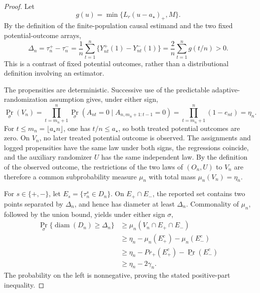 \documentclass{article}
\begin{document}
\begin{proof}
Let
\[
 g(u)=\min\{L_r(u-a_\star)_+,M\}.
\]
By the definition of the finite-population causal estimand and the two fixed potential-outcome arrays,
\[
 \Delta_n
 =\tau_n^+-\tau_n^-
 =\frac1n\sum_{t=1}^n\{Y_{nt}^+(1)-Y_{nt}^-(1)\}
 =\frac2n\sum_{t=1}^n g(t/n)>0.
\]
This is a contrast of fixed potential outcomes, rather than a distributional definition involving an estimator.

The propensities are deterministic.  Successive use of the predictable adaptive-randomization assumption gives, under either sign,
\[
 \Pr_\sigma(V_n)
 =\prod_{t=m_n+1}^n
   \Pr_\sigma(A_{nt}=0\mid A_{n,m_n+1:t-1}=0)
 =\prod_{t=m_n+1}^n(1-e_{nt})=\eta_n.
\]
For \(t\le m_n=\lfloor a_\star n\rfloor\), one has \(t/n\le a_\star\), so both treated potential outcomes are zero.  On \(V_n\), no later treated potential outcome is observed.  The assignments and logged propensities have the same law under both signs, the regressions coincide, and the auxiliary randomizer \(U\) has the same independent law.  By the definition of the observed outcome, the restrictions of the two laws of \((O_n,U)\) to \(V_n\) are therefore a common subprobability measure \(\mu_n\) with total mass \(\mu_n(V_n)=\eta_n\).

For \(s\in\{+,-\}\), let \(E_s=\{\tau_n^s\in D_n\}\).  On \(E_+\cap E_-\), the reported set contains two points separated by \(\Delta_n\), and hence has diameter at least \(\Delta_n\).  Commonality of \(\mu_n\), followed by the union bound, yields under either sign \(\sigma\),
\[
\begin{aligned}
 \Pr_\sigma\{\operatorname{diam}(D_n)\ge\Delta_n\}
 &\ge \mu_n(V_n\cap E_+\cap E_-)\\
 &\ge \eta_n-\mu_n(E_+^c)-\mu_n(E_-^c)\\
 &\ge \eta_n-Pr_+(E_+^c)-\Pr_-(E_-^c)\\
 &\ge \eta_n-2\gamma_n.
\end{aligned}
\]
The probability on the left is nonnegative, proving the stated positive-part inequality.


\end{proof}
\end{document}
